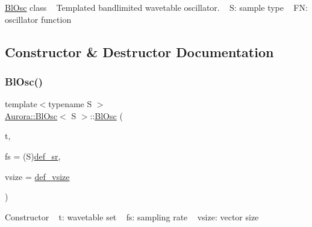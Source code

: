 \hyperlink{class_aurora_1_1_bl_osc}{Bl\+Osc} class ~\newline
Templated bandlimited wavetable oscillator. ~\newline
S\+: sample type ~\newline
FN\+: oscillator function 

\subsection{Constructor \& Destructor Documentation}
\mbox{\label{class_aurora_1_1_bl_osc_a1159b66d0a05dfd677cde07f5547c257}} 
\subsubsection{\texorpdfstring{Bl\+Osc()}{BlOsc()}\hspace{0.1cm}{\footnotesize\ttfamily [1/2]}}
{\footnotesize\ttfamily template$<$typename S $>$ \\
\hyperlink{class_aurora_1_1_bl_osc}{Aurora\+::\+Bl\+Osc}$<$ S $>$\+::\hyperlink{class_aurora_1_1_bl_osc}{Bl\+Osc} (\begin{DoxyParamCaption}\item[{const \hyperlink{class_aurora_1_1_table_set}{Table\+Set}$<$ S $>$ $\ast$}]{t,  }\item[{S}]{fs = {\ttfamily (S)\hyperlink{namespace_aurora_ad49263d809bea98dd422e95bc91bc03e}{def\+\_\+sr}},  }\item[{std\+::size\+\_\+t}]{vsize = {\ttfamily \hyperlink{namespace_aurora_afaaddf667a06e7ce23c667a8b7295263}{def\+\_\+vsize}} }\end{DoxyParamCaption})\hspace{0.3cm}{\ttfamily [inline]}}

Constructor ~\newline
t\+: wavetable set ~\newline
fs\+: sampling rate ~\newline
vsize\+: vector size \mbox{\label{class_aurora_1_1_bl_osc_a1159b66d0a05dfd677cde07f5547c257}} 
